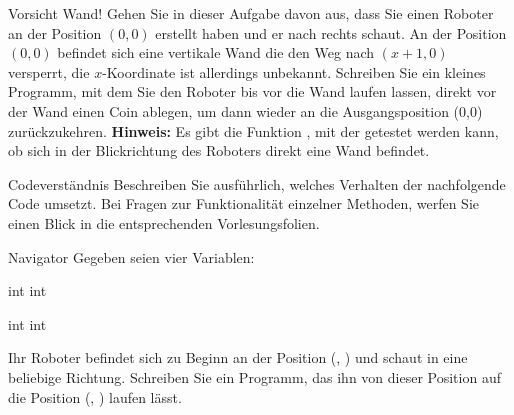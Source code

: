 \documentclass{../preamble}
\begin{document}
\begin{task}[credit = \stars{2}{3}]{Vorsicht Wand!}
    Gehen Sie in dieser Aufgabe davon aus, dass Sie einen Roboter  an der Position \((0, 0)\) erstellt haben und er nach rechts schaut. An der Position \((0,0)\) befindet sich eine vertikale Wand die den Weg nach \((x + 1, 0)\) versperrt, die \(x\)-Koordinate ist allerdings unbekannt. Schreiben Sie ein kleines Programm, mit dem Sie den Roboter bis vor die Wand laufen lassen, direkt vor der Wand einen Coin ablegen, um dann wieder an die Ausgangsposition (0,0) zurückzukehren.
    \br
    \textbf{Hinweis:} Es gibt die Funktion , mit der getestet werden kann, ob sich in der Blickrichtung des Roboters direkt eine Wand befindet.

    \begin{solution}
        
    \end{solution}
\end{task}

\clearpage

\begin{task}[credit = \stars{2}{3}]{Codeverständnis}
    Beschreiben Sie ausführlich, welches Verhalten der nachfolgende Code umsetzt. Bei Fragen zur Funktionalität einzelner Methoden, werfen Sie einen Blick in die entsprechenden Vorlesungsfolien.
    

    \clearpage

    \begin{solution}
        
    \end{solution}
\end{task}

\clearpage

\begin{task}[credit = \stars{3}{3}]{Navigator}
    Gegeben seien vier Variablen:

    \begin{minipage}{0.475\textwidth}
        \begin{flushright}
            \textcolor{keywordcolor}{int} 
            \br
            \textcolor{keywordcolor}{int} 
        \end{flushright}
    \end{minipage}
    \hfill
    \begin{minipage}{0.475\textwidth}
        \textcolor{keywordcolor}{int} 
        \br
        \textcolor{keywordcolor}{int} 
    \end{minipage}
    \br
    Ihr Roboter befindet sich zu Beginn an der Position (, ) und schaut in eine beliebige Richtung. Schreiben Sie ein Programm, das ihn von dieser Position auf die Position (, ) laufen lässt.

    \begin{solution}
        
    \end{solution}
\end{task}
\end{document}
